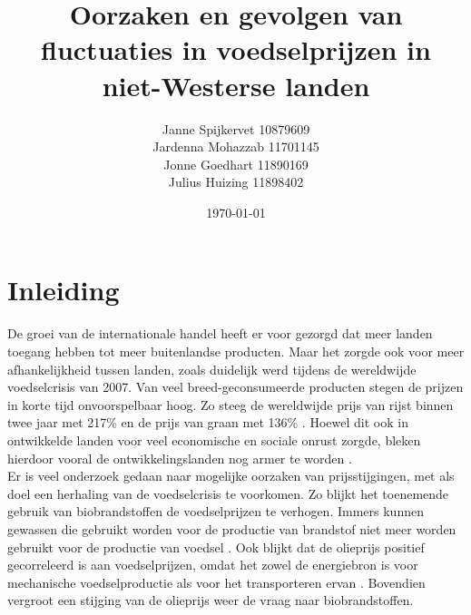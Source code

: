\documentclass{article}
\title{Oorzaken en gevolgen van fluctuaties in voedselprijzen in niet-Westerse landen}
\author{Janne Spijkervet 10879609\\ Jardenna Mohazzab 11701145\\ Jonne Goedhart 11890169 \\Julius Huizing 11898402}
\date{\today{}}
\begin{document}
\maketitle

\newpage

\section*{Inleiding}

De groei van de internationale handel heeft er voor gezorgd dat meer landen toegang hebben tot meer buitenlandse producten. Maar het zorgde ook voor meer afhankelijkheid tussen landen, zoals duidelijk werd tijdens de wereldwijde voedselcrisis van 2007. Van veel breed-geconsumeerde producten stegen de prijzen in korte tijd onvoorspelbaar hoog. Zo steeg de wereldwijde prijs van rijst binnen twee jaar met  217\% en de prijs van graan met 136\% \cite{steinberg2008financial}. Hoewel dit ook in ontwikkelde landen voor veel economische en sociale onrust zorgde, bleken hierdoor vooral de ontwikkelingslanden nog armer te worden \cite{ivanic2008implications}. \\

Er is veel onderzoek gedaan naar mogelijke oorzaken van prijsstijgingen, met als doel een herhaling van de voedselcrisis te voorkomen. Zo blijkt het toenemende gebruik van biobrandstoffen de voedselprijzen te verhogen. Immers kunnen gewassen die gebruikt worden voor de productie van brandstof niet meer worden gebruikt voor de productie van voedsel \cite{mitchell2008note}. 
Ook blijkt dat de olieprijs positief gecorreleerd is aan voedselprijzen, omdat het zowel de energiebron is voor mechanische voedselproductie als voor het transporteren ervan \cite{zubrin2008food}. Bovendien vergroot een stijging van de olieprijs weer de vraag naar biobrandstoffen.\\

\end{document}
